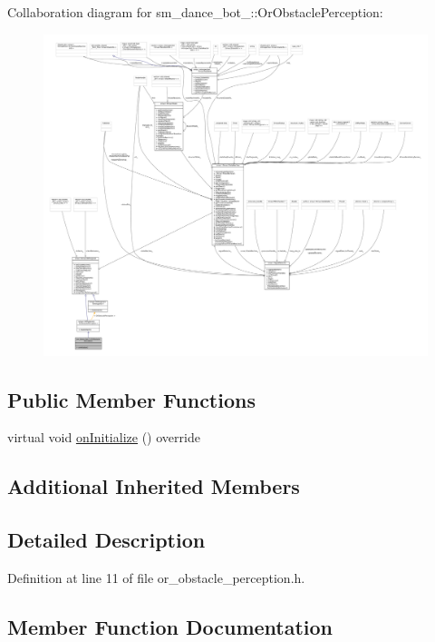 Collaboration diagram for sm\+\_\+dance\+\_\+bot\+\_\+:\+:Or\+Obstacle\+Perception\+:
\nopagebreak
\begin{figure}[H]
\begin{center}
\leavevmode
\includegraphics[width=350pt]{classsm__dance__bot__2_1_1OrObstaclePerception__coll__graph}
\end{center}
\end{figure}
\subsection*{Public Member Functions}
\begin{DoxyCompactItemize}
\item 
virtual void \hyperlink{classsm__dance__bot__2_1_1OrObstaclePerception_a0c38cec76ed524ffa25c0cd305966045}{on\+Initialize} () override
\end{DoxyCompactItemize}
\subsection*{Additional Inherited Members}


\subsection{Detailed Description}


Definition at line 11 of file or\+\_\+obstacle\+\_\+perception.\+h.



\subsection{Member Function Documentation}
